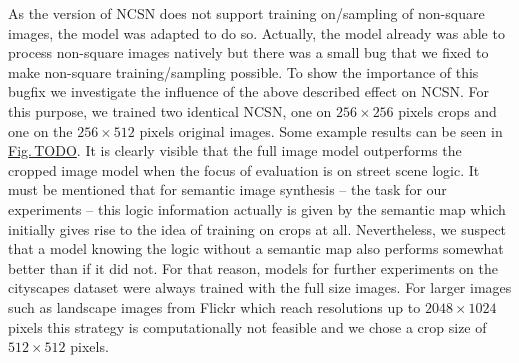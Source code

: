 As the version of NCSN \cite{score_3} does not support training on/sampling of non-square images, the model was adapted to do so. Actually, the model already was able to process non-square images natively but there was a small bug that we fixed to make non-square training/sampling possible. To show the importance of this bugfix we investigate the influence of the above described effect on NCSN. For this purpose, we trained two identical NCSN, one on $256\times256$ pixels crops and one on the $256\times512$ pixels original images. Some example results can be seen in \hyperref[fig:]{Fig.\,TODO}. It is clearly visible that the full image model outperforms the cropped image model when the focus of evaluation is on street scene logic. It must be mentioned that for semantic image synthesis – the task for our experiments – this logic information actually is given by the semantic map which initially gives rise to the idea of training on crops at all. Nevertheless, we suspect that a model knowing the logic without a semantic map also performs somewhat better than if it did not. For that reason, models for further experiments on the cityscapes dataset were always trained with the full size images. For larger images such as landscape images from Flickr which reach resolutions up to $2048\times1024$ pixels this strategy is computationally not feasible and we chose a crop size of $512\times512$ pixels.
